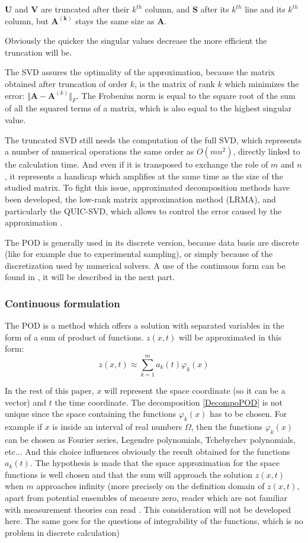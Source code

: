\documentclass[12pt,a4paper]{article}
\begin{document}
$\mathbf{U}$ and $\mathbf{V}$ are truncated after their $k^{th}$ column, and $\mathbf{S}$ after its $k^{th}$ line and its  $k^{th}$ column, but $\mathbf{A^{(k)}}$ stays the same size as $\mathbf{A}$.

Obviously the quicker the singular values decrease the more efficient the truncation will be.

The SVD assures the optimality of the approximation, because the matrix obtained after truncation of order $k$, is the matrix of rank $k$ which minimizes the error: $  \Vert \mathbf{A} - \mathbf{A}^{(k)} \Vert_F$. The Frobenius norm is equal to the square root of the sum of all the squared terms of a matrix, which is also equal to the highest singular value.

The truncated SVD still needs the computation of the full SVD, which represents a number of numerical operations the same order as $O(mn^2)$, directly linked to the calculation time. And even if it is transposed to exchange the role of $m$ and $n$, it represents a handicap which amplifies at the same time as the size of the studied matrix. To fight this issue, approximated decomposition methods have been developed, the low-rank matrix approximation method (LRMA), and particularly the QUIC-SVD, which allows to control the error caused by the approximation \cite{QUIC-SVD}.

The POD is generally used in its discrete version, because data basis are discrete (like for example due to experimental sampling), or simply because of the discretization used by numerical solvers. A use of the continuous form can be found in \cite{Turbulence}, it will be described in the next part.

\subsubsection{Continuous formulation}
The POD is a method which offers a solution with separated variables in the form of a sum of product of functions. $z(x,t)$ will be approximated in this form:
\begin{equation}
\label{DecompoPOD}
z(x,t) \approx \sum_{k=1}^m a_k(t) \varphi_k(x)
\end{equation}

In the rest of this paper, $x$ will represent the space coordinate (so it can be a vector) and $t$ the time coordinate. The decomposition \ref{DecompoPOD} is not unique since the space containing the functions $\varphi_k(x)$ has to be chosen. For example if $x$ is inside an interval of real numbers $\Omega$,  then the functions $\varphi_k(x)$ can be chosen as Fourier series, Legendre polynomials, Tchebychev polynomials, etc... And this choice influences obviously the result obtained for the functions $a_k(t)$. The hypothesis is made that the space approximation for the space functions is well chosen and that the sum will approach the solution $z(x,t)$ when $m$ approaches infinity (more precisely on the definition domain of $z(x,t)$, apart from potential ensembles of measure zero, reader which are not familiar with measurement theories can read \cite{Analysis}. This consideration will not be developed here. The same goes for the questions of integrability of the functions, which is no problem in discrete calculation)
\end{document}
